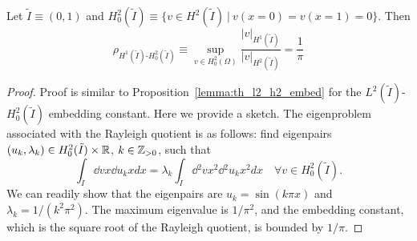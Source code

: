 \begin{lemma}
  \label{lemma:th_h1_h2_embed}
  Let $\tilde I \equiv (0,1)$ and $H^2_0(\tilde I) \equiv \{ v \in H^2(\tilde I) \ | \ v(x=0) = v(x=1) = 0 \}$. Then 
  \begin{equation*}
    \rho_{H^1(\tilde I)\text{-}H^2_0(\tilde I)} \equiv \sup_{v \in H^2_0(\Omega)} \frac{| v |_{H^1(\tilde I)}}{| v |_{H^2(\tilde I)}} = \frac{1}{\pi}
  \end{equation*}
  \begin{proof}
    Proof is similar to Proposition~\ref{lemma:th_l2_h2_embed} for the $L^2(\tilde I)$-$H^2_0(\tilde I)$ embedding constant. Here we provide a sketch. The eigenproblem associated with the Rayleigh quotient is as follows: find eigenpairs $(u_k,\lambda_k) \in H^2_0(\tilde I) \times \mathbb{R}$, $k \in \mathbb{Z}_{> 0}$, such that
    \begin{equation*}
      \int_{\tilde I} \dd{v}{x} \dd{u_k}{x} dx
      = \lambda_k \int_{\tilde I} \dd{^2v}{x^2} \dd{^2u_k}{x^2} dx \quad \forall v \in H^2_0(\tilde I).
    \end{equation*}
    We can readily show that the eigenpairs are $u_k = \sin(k \pi x)$ and $\lambda_k = 1/ (k^2 \pi^2)$.  The maximum eigenvalue is $1/\pi^2$, and the embedding constant, which is the square root of the Rayleigh quotient, is bounded by $1/\pi$.
  \end{proof}
\end{lemma}
